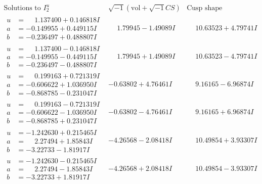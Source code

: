 \documentclass[1p]{elsarticle_modified}
\theoremstyle{definition}
\newcommand{\I}{\sqrt{-1}}
\begin{document}
$$\begin{array}{c|c|c}  
\text{Solutions to }I^u_{2}& \I (\text{vol} + \sqrt{-1}CS) & \text{Cusp shape}\\
 \hline 
\begin{aligned}
u &= \phantom{-}1.137400 + 0.146818 I \\
a &= -0.149955 + 0.449115 I \\
b &= -0.236497 + 0.488807 I\end{aligned}
 & \phantom{-}1.79945 - 1.49089 I & \phantom{-}10.63523 + 4.79741 I \\ \hline\begin{aligned}
u &= \phantom{-}1.137400 - 0.146818 I \\
a &= -0.149955 - 0.449115 I \\
b &= -0.236497 - 0.488807 I\end{aligned}
 & \phantom{-}1.79945 + 1.49089 I & \phantom{-}10.63523 - 4.79741 I \\ \hline\begin{aligned}
u &= \phantom{-}0.199163 + 0.721319 I \\
a &= -0.606622 + 1.036950 I \\
b &= -0.868785 - 0.231047 I\end{aligned}
 & -0.63802 + 4.76461 I & \phantom{-}9.16165 - 6.96874 I \\ \hline\begin{aligned}
u &= \phantom{-}0.199163 - 0.721319 I \\
a &= -0.606622 - 1.036950 I \\
b &= -0.868785 + 0.231047 I\end{aligned}
 & -0.63802 - 4.76461 I & \phantom{-}9.16165 + 6.96874 I \\ \hline\begin{aligned}
u &= -1.242630 + 0.215465 I \\
a &= \phantom{-}2.27494 + 1.85843 I \\
b &= -3.22733 - 1.81917 I\end{aligned}
 & -4.26568 - 2.08418 I & \phantom{-}10.49854 + 3.93307 I \\ \hline\begin{aligned}
u &= -1.242630 - 0.215465 I \\
a &= \phantom{-}2.27494 - 1.85843 I \\
b &= -3.22733 + 1.81917 I\end{aligned}
 & -4.26568 + 2.08418 I & \phantom{-}10.49854 - 3.93307 I \\ \hline\begin{aligned}

\end{aligned}
\end{array}$$
\end{document}
